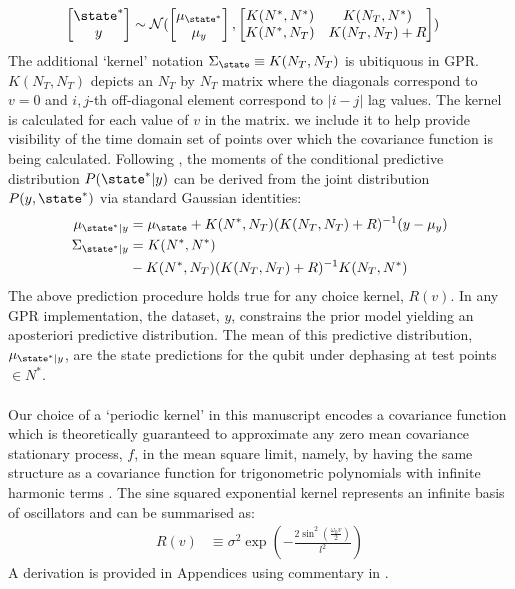 \begin{align}
\begin{bmatrix} \state^* \\y \end{bmatrix} & \sim \mathcal{N} (\begin{bmatrix} \mu_{\state^*} \\ \mu_y
\end{bmatrix} , \begin{bmatrix}   K(N^*,N^*)&K(N_T,N^*) \\ K(N^*,N_T) & K(N_T,N_T) + R \end{bmatrix} )
\end{align}
The additional `kernel' notation $\Sigma_\state  \equiv K(N_T, N_T)$ is ubitiquous in GPR. $K(N_T, N_T)$ depicts an $N_T$ by $N_T$ matrix where the diagonals correspond to $v=0$ and $i, j$-th off-diagonal element correspond to $|i-j|$ lag values. The kernel is calculated for each value of $v$ in the matrix.  we include it to help provide visibility of the time domain set of points over which the covariance function is being calculated. Following \cite{rasmussen2005gaussian}, the moments of the conditional predictive distribution $P(\state^*|y)$ can be derived from the joint distribution $P(y,\state^*)$ via standard Gaussian identities:
\begin{align}
\mu_{\state^*|y} &= \mu_\state + K(N^*,N_T)(K(N_T,N_T) + R )^{-1} (y - \mu_y) \\
\Sigma_{\state^*|y} &= K(N^*,N^*) \nonumber \\
& - K(N^*,N_T)(K(N_T, N_T) + R)^{-1}K(N_T,N^*) 
\end{align}
The above prediction procedure holds true for any choice kernel, $R(v)$. In any GPR implementation, the dataset, $y$, constrains the prior model yielding an aposteriori predictive distribution. The mean of this predictive distribution, $\mu_{\state^*|y}$, are the state predictions for the qubit under dephasing at test points $\in N^*$.
\\
\\
Our choice of a `periodic kernel' in this manuscript encodes a covariance function which is theoretically guaranteed to approximate any zero mean covariance stationary process, $f$, in the mean square limit, namely, by having the same structure as a covariance function for trigonometric polynomials with infinite harmonic terms \cite{solin2014explicit, karlin2012first}. The sine squared exponential kernel represents an infinite basis of oscillators and can be summarised as:
\begin{align}
R(v) &\equiv \sigma^2 \exp (- \frac{2\sin^2(\frac{\omega_0 v}{2})}{l^2}) 
\end{align} A derivation is provided in Appendices using commentary in \cite{solin2014explicit}.
